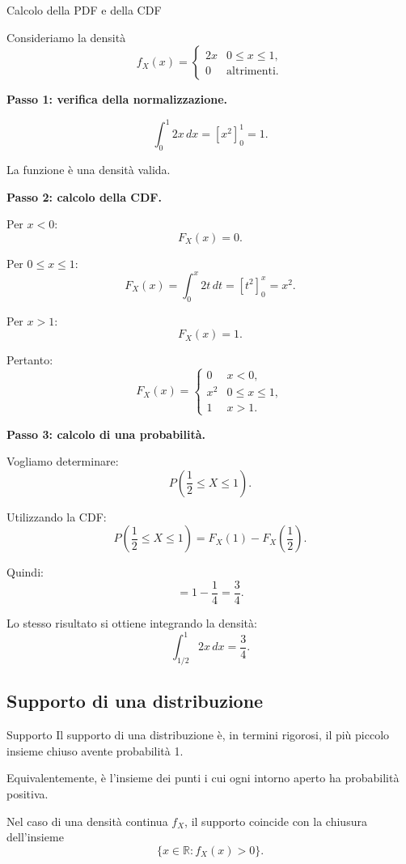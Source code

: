 \begin{example}{Calcolo della PDF e della CDF}

Consideriamo la densità
\[
f_X(x)=
\begin{cases}
2x & 0\leq x\leq1,\\
0 & \text{altrimenti}.
\end{cases}
\]

\textbf{Passo 1: verifica della normalizzazione.}

\[
\int_0^1 2x\,dx
=
[x^2]_0^1
=
1.
\]

La funzione è una densità valida.

\textbf{Passo 2: calcolo della CDF.}

Per $x<0$:
\[
F_X(x)=0.
\]

Per $0\leq x\leq1$:
\[
F_X(x)
=
\int_0^x 2t\,dt
=
[t^2]_0^x
=
x^2.
\]

Per $x>1$:
\[
F_X(x)=1.
\]

Pertanto:
\[
\boxed{
F_X(x)=
\begin{cases}
0 & x<0,\\
x^2 & 0\leq x\leq1,\\
1 & x>1.
\end{cases}
}
\]

\textbf{Passo 3: calcolo di una probabilità.}

Vogliamo determinare:
\[
P\left(\frac12\leq X\leq1\right).
\]

Utilizzando la CDF:
\[
P\left(\frac12\leq X\leq1\right)
=
F_X(1)-F_X\left(\frac12\right).
\]

Quindi:
\[
=1-\frac14
=\boxed{\frac34}.
\]

Lo stesso risultato si ottiene
integrando la densità:
\[
\int_{1/2}^1 2x\,dx
=
\frac34.
\]
\end{example}

\subsection{Supporto di una distribuzione}

\begin{definition}{Supporto}
Il supporto di una distribuzione è,
in termini rigorosi, il più piccolo
insieme chiuso avente probabilità 1.

Equivalentemente, è l'insieme dei punti
i cui ogni intorno aperto ha
probabilità positiva.
\end{definition}

Nel caso di una densità continua $f_X$,
il supporto coincide con la chiusura
dell'insieme
\[
\{x\in\mathbb{R}:f_X(x)>0\}.
\]

